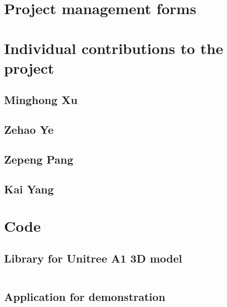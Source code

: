 \newpage
\appendix
\appendixpage
\addappheadtotoc


\chapter{Project management forms}









\chapter{Individual contributions to the project}
\section{Minghong Xu}
\section{Zehao Ye}
\section{Zepeng Pang}
\section{Kai Yang}


\chapter{Code}

\section{Library for Unitree A1 3D model}
\inputminted[fontsize=\tiny, breaklines]{python}{../simulation/liba1.py}

\section{Application for demonstration}
\inputminted[fontsize=\tiny, breaklines]{python}{../simulation/pose_control.py}
